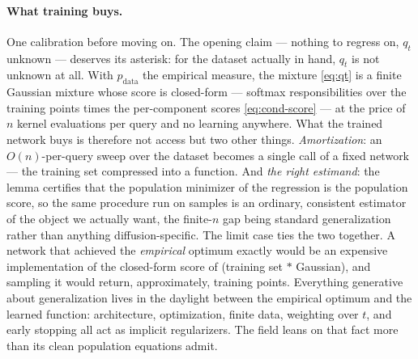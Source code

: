 \documentclass[10pt,a4paper]{article}
\begin{document}
\paragraph{What training buys.}
One calibration before moving on. The opening claim --- nothing to
regress on, $q_t$ unknown --- deserves its asterisk: for the dataset
actually in hand, $q_t$ is not unknown at all. With $p_{\mathrm{data}}$
the empirical measure, the mixture \eqref{eq:qt} is a finite Gaussian
mixture whose score is closed-form --- softmax responsibilities over the
training points times the per-component scores \eqref{eq:cond-score} ---
at the price of $n$ kernel evaluations per query and no learning
anywhere. What the trained network buys is therefore not access but two
other things. \emph{Amortization}: an $O(n)$-per-query sweep over the
dataset becomes a single call of a fixed network --- the training set
compressed into a function. And \emph{the right estimand}: the lemma
certifies that the population minimizer of the regression is the
population score, so the same procedure run on samples is an ordinary,
consistent estimator of the object we actually want, the finite-$n$ gap
being standard generalization rather than anything diffusion-specific.
The limit case ties the two together. A network that achieved the
\emph{empirical} optimum exactly would be an expensive implementation of
the closed-form score of (training set $\ast$ Gaussian), and sampling it
would return, approximately, training points. Everything generative about
generalization lives in the daylight between the empirical optimum and
the learned function: architecture, optimization, finite data, weighting
over $t$, and early stopping all act as implicit regularizers. The field
leans on that fact more than its clean population equations admit.
\end{document}
